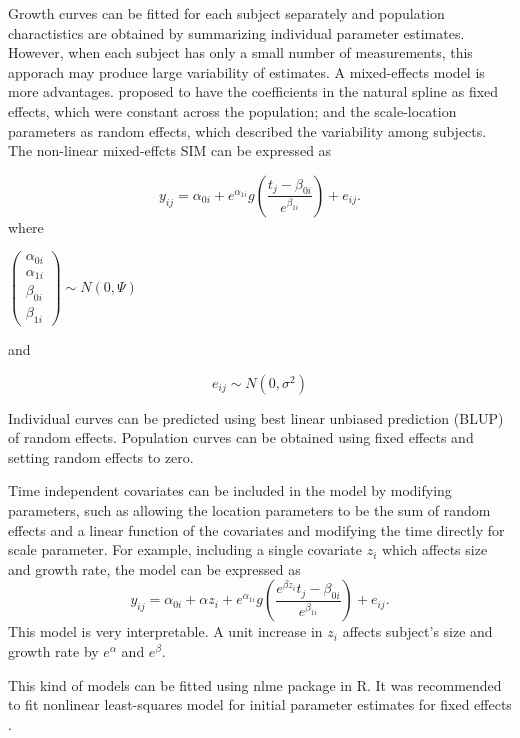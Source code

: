 \documentclass{article}
\numberwithin{equation}{section}
\begin{document}
Growth curves can be fitted for each subject separately and population charactistics are obtained by summarizing individual parameter estimates. However, when each subject has only a small number of measurements, this apporach may produce large variability of estimates. A mixed-effects model is more advantages. \cite{beath2007infant} proposed to have the coefficients in the natural spline as fixed effects, which were constant across the population; and the scale-location parameters as random effects, which described the variability among subjects. The non-linear mixed-effcts SIM can be expressed as

  
\begin{equation}
y_{ij} = \alpha_{0i}+e^{\alpha_{1i}}g\left(\frac{t_j-\beta_{0i}}{e^{\beta_{1i}}}\right)+e_{ij}.
\end{equation}
where 
\begin{center}
$\begin{pmatrix}
\alpha_{0i} \\ 
\alpha_{1i} \\
\beta_{0i} \\
\beta_{1i}
\end{pmatrix}
\sim N(0, \Psi)$

\end{center}
and

$$ e_{ij} \sim N(0,\sigma^2) $$

Individual curves can be predicted using best linear unbiased prediction (BLUP) of random effects. Population curves can be obtained using fixed effects and setting random effects to zero.

Time independent covariates can be included in the model by modifying parameters, such as allowing the location parameters to be the sum of random effects and a linear
function of the covariates and modifying the time directly for scale parameter. For example, including a single covariate $z_i$ which affects size and growth rate, the model can be expressed as
 \begin{equation}
 y_{ij} = \alpha_{0i}+\alpha z_i+e^{\alpha_{1i}}g\left(\frac{e^{\beta z_i}t_j-\beta_{0i}}{e^{\beta_{1i}}}\right)+e_{ij}.
 \end{equation}
 This model is very interpretable. A unit increase in $z_i$ affects subject’s size and growth rate by $e^\alpha$ and $e^\beta$.
 
 This kind of models can be fitted using nlme package \cite{pinheiro2011mixed} in R. It was recommended to fit nonlinear least-squares model for initial parameter estimates for fixed effects \cite{beath2007infant}. 
 
\end{document}
